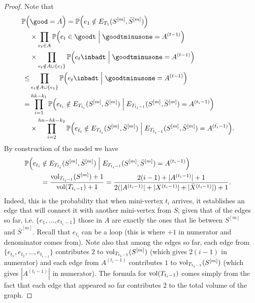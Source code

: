 \documentclass[runningheads, envcountsame, smallextended]{llncs}
\newcommand{\vol}{{\rm vol}}
\newcommand{\pr}{{\mathbb P}}
\numberwithin{theorem}{section}
\numberwithin{definition}{section}
\numberwithin{lemma}{section}
\numberwithin{corollary}{section}
\numberwithin{proposition}{section}
\numberwithin{conjecture}{section}
\numberwithin{remark}{section}
\numberwithin{equation}{section}
\begin{document}
\begin{proof}
	Note that
	\begin{equation} \label{ineq:main}
		\begin{split}
			\pr\Big(&\good  
			=  A \Big)  =  \pr \Big( e_1 \notin E_{T_1}(S^{[m]},\bar{S}^{[m]}) \Big)\\
			& \times \prod_{e_t \in A} \pr\Big( e_t \in \goodt \;  \Big| \; \goodtminusone = A^{(t-1)} \Big)\\
			& \times \prod_{e_t \notin A \cup \{e_1\}} \pr\Big( e_t \inbadt \;  \Big| \; \goodtminusone = A^{(t-1)} \Big)\\
			\leq & \prod_{e_t \notin A \cup \{e_1\}} \pr\Big( e_t \inbadt  \;  \Big| \; \goodtminusone = A^{(t-1)} \Big) \\
			= & \prod_{i = 1}^{hk-k_1} \pr\Big( e_{t_i} \notin E_{T_{t_i}}(S^{[m]}, \bar{S}^{[m]}) \;  \Big| \; E_{T_{t_i-1}}(S^{[m]}, \bar{S}^{[m]}) = A^{(t_i-1)} \Big)\\
			& \times \prod_{i=2}^{hn-hk-k_2} \pr\Big( e_{\bar{t}_i} \notin  E_{T_{\bar{t}_i}}(S^{[m]}, \bar{S}^{[m]}) \;  \Big| \; E_{T_{\bar{t}_i-1}}(S^{[m]}, \bar{S}^{[m]}) = A^{(\bar{t_i}-1)} \Big).
		\end{split}
	\end{equation}
	By construction of the model we have
	\begin{equation} \label{ineq:S}
		\begin{split}
			\pr\Big( e_{t_i} & \notin E_{T_{t_i}}(S^{[m]}, \bar{S}^{[m]}) \;  \Big| \; E_{T_{t_i-1}}(S^{[m]}, \bar{S}^{[m]})		 = A^{(t_i-1)}\Big) \\&
			= \frac{\vol_{T_{t_i-1}}(S^{[m]})+1}{\vol(T_{t_i-1})+1} = \frac{2(i-1)+|A^{(t_i-1)}|+1}{2(|A^{(t_i-1)}|+|X^{(t_i-1)}|+|\bar{X}^{(t_i-1)}|)+1}.
		\end{split}
	\end{equation}
	Indeed, this is the probability that when mini-vertex $t_i$ arrives, it establishes an edge that will connect it with another mini-vertex from $S$, given that of the edges so far, i.e. $\{e_1, \ldots, e_{t_i-1}\}$ those in $A$ are exactly the ones that lie between $S^{[m]}$ and $\bar{S}^{[m]}$. Recall that $e_{t_i}$ can be a loop (this is where $+1$ in numerator and denominator comes from). Note also that among the edges so far, each edge from $\{e_{t_1}, e_{t_2}, \ldots, e_{t_{i-1}}\}$ contributes $2$ to $\vol_{T_{t_i-1}}(S^{[m]})$ (which gives $2(i-1)$ in numerator) and each edge from $A^{(t_i-1)}$ contributes $1$ to $\vol_{T_{t_i-1}}(S^{[m]})$ (which gives $|A^{(t_i-1)}|$ in numerator). The formula for $\vol(T_{t_i-1})$ comes simply from the fact that each edge that appeared so far contributes $2$ to the total volume of the graph.
	

\end{proof}
\end{document}
